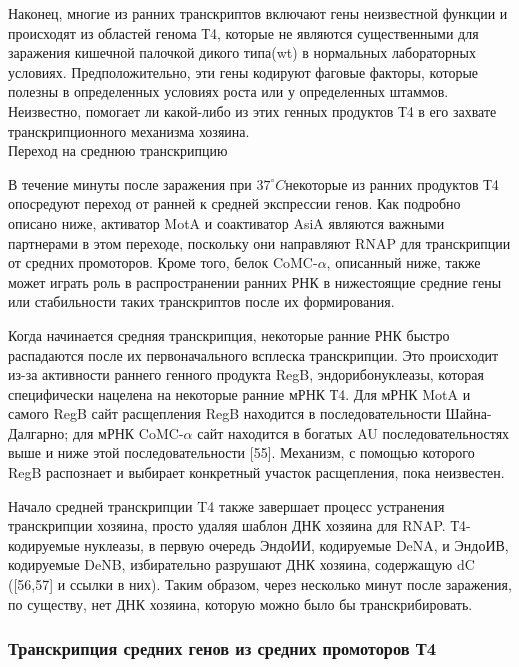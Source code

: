 \documentclass[a4paper,12pt]{article}
\begin{document}
            \par{Наконец, многие из ранних транскриптов включают гены неизвестной функции и происходят из областей генома
            Т4, которые не являются существенными для заражения кишечной палочкой дикого типа(wt) в нормальных
            лабораторных условиях. Предположительно, эти гены кодируют фаговые факторы, которые полезны в определенных
            условиях роста или у определенных штаммов. Неизвестно, помогает ли какой-либо из этих генных продуктов Т4 в
            его захвате транскрипционного механизма хозяина.} \\
        {\Large Переход на среднюю транскрипцию}
            \par{В течение минуты после заражения при $ 37^{\circ}C $некоторые из ранних продуктов Т4 опосредуют переход
            от ранней к средней экспрессии генов. Как подробно описано ниже, активатор MotA и соактиватор AsiA являются
            важными партнерами в этом переходе, поскольку они направляют RNAP для транскрипции от средних промоторов.
            Кроме того, белок CoMC-$\alpha$, описанный ниже, также может играть роль в распространении ранних РНК в
            нижестоящие средние гены или стабильности таких транскриптов после их формирования.}
            \par{Когда начинается средняя транскрипция, некоторые ранние РНК быстро распадаются после их первоначального
            всплеска транскрипции. Это происходит из-за активности раннего генного продукта RegB, эндорибонуклеазы,
            которая специфически нацелена на некоторые ранние мРНК Т4. Для мРНК MotA и самого RegB сайт расщепления RegB
            находится в последовательности Шайна-Далгарно; для мРНК CoMC-$\alpha$ сайт находится в богатых AU
            последовательностях выше и ниже этой последовательности [55]. Механизм, с помощью которого RegB распознает и
            выбирает конкретный участок расщепления, пока неизвестен.}
            \par{Начало средней транскрипции T4 также завершает процесс устранения транскрипции хозяина, просто удаляя
            шаблон ДНК хозяина для RNAP. Т4-кодируемые нуклеазы, в первую очередь ЭндоИИ, кодируемые DeNA, и ЭндоИВ,
            кодируемые DeNB, избирательно разрушают ДНК хозяина, содержащую dC ([56,57] и ссылки в них). Таким образом,
            через несколько минут после заражения, по существу, нет ДНК хозяина, которую можно было бы транскрибировать.}
\begin{center}
    \item    \subsubsection{Транскрипция средних генов из средних промоторов Т4}
\end{center}
\end{document}
